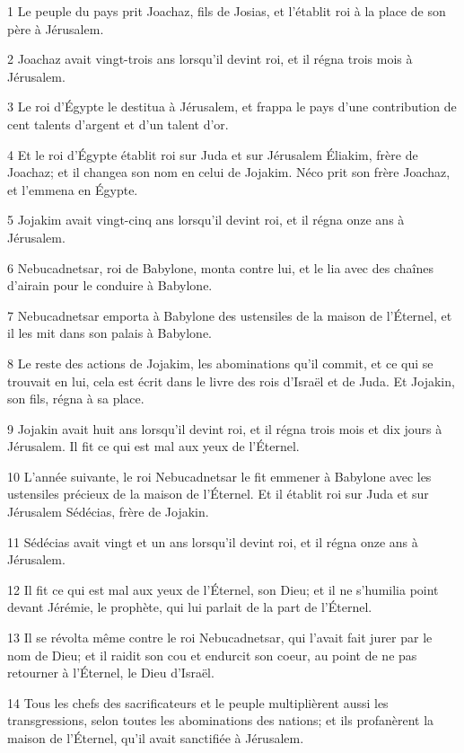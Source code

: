 \par 1 Le peuple du pays prit Joachaz, fils de Josias, et l'établit roi à la place de son père à Jérusalem.
\par 2 Joachaz avait vingt-trois ans lorsqu'il devint roi, et il régna trois mois à Jérusalem.
\par 3 Le roi d'Égypte le destitua à Jérusalem, et frappa le pays d'une contribution de cent talents d'argent et d'un talent d'or.
\par 4 Et le roi d'Égypte établit roi sur Juda et sur Jérusalem Éliakim, frère de Joachaz; et il changea son nom en celui de Jojakim. Néco prit son frère Joachaz, et l'emmena en Égypte.
\par 5 Jojakim avait vingt-cinq ans lorsqu'il devint roi, et il régna onze ans à Jérusalem.
\par 6 Nebucadnetsar, roi de Babylone, monta contre lui, et le lia avec des chaînes d'airain pour le conduire à Babylone.
\par 7 Nebucadnetsar emporta à Babylone des ustensiles de la maison de l'Éternel, et il les mit dans son palais à Babylone.
\par 8 Le reste des actions de Jojakim, les abominations qu'il commit, et ce qui se trouvait en lui, cela est écrit dans le livre des rois d'Israël et de Juda. Et Jojakin, son fils, régna à sa place.
\par 9 Jojakin avait huit ans lorsqu'il devint roi, et il régna trois mois et dix jours à Jérusalem. Il fit ce qui est mal aux yeux de l'Éternel.
\par 10 L'année suivante, le roi Nebucadnetsar le fit emmener à Babylone avec les ustensiles précieux de la maison de l'Éternel. Et il établit roi sur Juda et sur Jérusalem Sédécias, frère de Jojakin.
\par 11 Sédécias avait vingt et un ans lorsqu'il devint roi, et il régna onze ans à Jérusalem.
\par 12 Il fit ce qui est mal aux yeux de l'Éternel, son Dieu; et il ne s'humilia point devant Jérémie, le prophète, qui lui parlait de la part de l'Éternel.
\par 13 Il se révolta même contre le roi Nebucadnetsar, qui l'avait fait jurer par le nom de Dieu; et il raidit son cou et endurcit son coeur, au point de ne pas retourner à l'Éternel, le Dieu d'Israël.
\par 14 Tous les chefs des sacrificateurs et le peuple multiplièrent aussi les transgressions, selon toutes les abominations des nations; et ils profanèrent la maison de l'Éternel, qu'il avait sanctifiée à Jérusalem.
